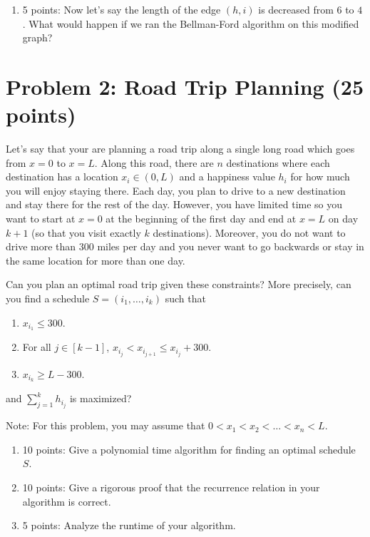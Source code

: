 \documentclass[12pt]{article}
\begin{document}
\begin{enumerate}
\begin{center}
\begin{tikzpicture}
    \end{tikzpicture}
    \end{center}
What are the shortest path(s) from $s$ to $t$?
\item[(b)] 5 points: Now let's say the length of the edge $(h,i)$ is decreased from $6$ to $4$. What would happen if we ran the Bellman-Ford algorithm on this modified graph?
\end{enumerate}
\section*{Problem 2: Road Trip Planning (25 points)}
Let's say that your are planning a road trip along a single long road which goes from $x = 0$ to $x = L$. Along this road, there are $n$ destinations where each destination has a location $x_i \in (0,L)$ and a happiness value $h_i$ for how much you will enjoy staying there. Each day, you plan to drive to a new destination and stay there for the rest of the day. However, you have limited time so you want to start at $x = 0$ at the beginning of the first day and end at $x = L$ on day $k+1$ (so that you visit exactly $k$ destinations). Moreover, you do not want to drive more than $300$ miles per day and you never want to go backwards or stay in the same location for more than one day. 

Can you plan an optimal road trip given these constraints? More precisely, can you find a schedule $S = (i_1,\ldots,i_k)$ such that \begin{enumerate}
\item $x_{i_1} \leq 300$. 
\item For all $j \in [k-1]$, $x_{i_j} < x_{i_{j+1}} \leq x_{i_j} + 300$.
\item $x_{i_{k}} \geq L - 300$.
\end{enumerate}
and $\sum_{j = 1}^{k}{h_{i_j}}$ is maximized?

Note: For this problem, you may assume that $0 < x_1 < x_2 < \ldots < x_n < L$.
\begin{enumerate}
\item[(a)] 10 points: Give a polynomial time algorithm for finding an optimal schedule $S$.
\item[(b)] 10 points: Give a rigorous proof that the recurrence relation in your algorithm is correct.
\item[(c)] 5 points: Analyze the runtime of your algorithm.
\end{enumerate}
\end{document}
